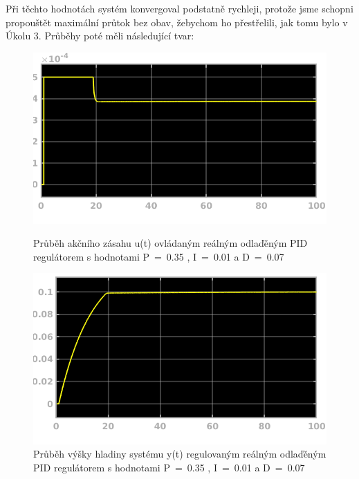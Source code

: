 \documentclass{article}
\begin{document}
	\indent Při těchto hodnotách systém konvergoval podstatně rychleji, protože jsme schopni propouštět maximální průtok bez obav, žebychom ho přestřelili, jak tomu bylo v Úkolu 3. Průběhy poté měli následující tvar:
	\begin{figure}[H]
	   		 \begin{minipage}[b]{.45\textwidth}
    \centering
    \includegraphics[width=\linewidth]{ukol4PIDuLAD}
    \caption{Průběh akčního zásahu u(t) ovládaným reálným odlaďěným PID regulátorem s hodnotami P~=~0.35 , I~=~0.01 a D~=~0.07}
  \end{minipage}\hfill
  \begin{minipage}[b]{.45\textwidth}
    \centering
    \includegraphics[width=\linewidth]{ukol4PIDyLAD}
    \caption{Průběh výšky hladiny systému y(t) regulovaným reálným odlaďěným PID regulátorem s hodnotami P~=~0.35 , I~=~0.01 a D~=~0.07}
    \label{img:hladinaPIDrealLAD}
  \end{minipage}
	   		\end{figure}	
	
\end{document}
